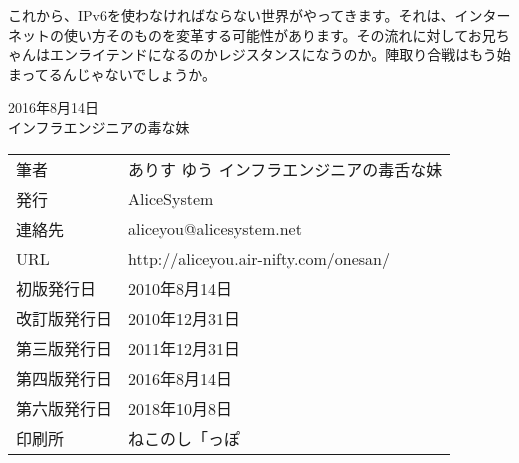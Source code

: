 これから、IPv6を使わなければならない世界がやってきます。それは、インターネットの使い方そのものを変革する可能性があります。その流れに対してお兄ちゃんはエンライテンドになるのかレジスタンスになうのか。陣取り合戦はもう始まってるんじゃないでしょうか。



\begin{flushright}
2016年8月14日 \\
インフラエンジニアの毒な妹 \\
\end{flushright}



\thispagestyle{empty}
\mbox{}
\newpage
\clearpage


\thispagestyle{empty}

\vspace*{\fill}
\begin{tabular}{ll} \toprule
筆者 & ありす ゆう インフラエンジニアの毒舌な妹 \\
発行 & AliceSystem \\
連絡先 & aliceyou@alicesystem.net \\
URL & http://aliceyou.air-nifty.com/onesan/ \\
初版発行日 & 2010年8月14日 \\
改訂版発行日 & 2010年12月31日 \\
第三版発行日 & 2011年12月31日 \\
第四版発行日 & 2016年8月14日 \\
第六版発行日 & 2018年10月8日 \\
印刷所 & ねこのし「っぽ \\ \bottomrule
\end{tabular}